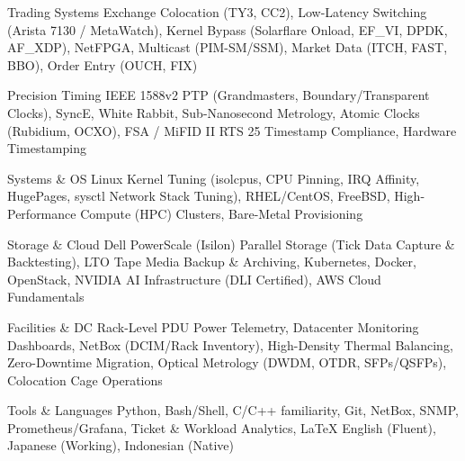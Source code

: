 

\begin{cvskills}

  \cvskill
    {Trading Systems} %
    {Exchange Colocation (TY3, CC2), Low-Latency Switching (Arista 7130 / MetaWatch), Kernel Bypass (Solarflare Onload, EF\_VI, DPDK, AF\_XDP), NetFPGA, Multicast (PIM-SM/SSM), Market Data (ITCH, FAST, BBO), Order Entry (OUCH, FIX)} %

  \cvskill
    {Precision Timing} %
    {IEEE 1588v2 PTP (Grandmasters, Boundary/Transparent Clocks), SyncE, White Rabbit, Sub-Nanosecond Metrology, Atomic Clocks (Rubidium, OCXO), FSA / MiFID II RTS 25 Timestamp Compliance, Hardware Timestamping} %

  \cvskill
    {Systems \& OS} %
    {Linux Kernel Tuning (isolcpus, CPU Pinning, IRQ Affinity, HugePages, sysctl Network Stack Tuning), RHEL/CentOS, FreeBSD, High-Performance Compute (HPC) Clusters, Bare-Metal Provisioning} %

  \cvskill
    {Storage \& Cloud} %
    {Dell PowerScale (Isilon) Parallel Storage (Tick Data Capture \& Backtesting), LTO Tape Media Backup \& Archiving, Kubernetes, Docker, OpenStack, NVIDIA AI Infrastructure (DLI Certified), AWS Cloud Fundamentals} %

  \cvskill
    {Facilities \& DC} %
    {Rack-Level PDU Power Telemetry, Datacenter Monitoring Dashboards, NetBox (DCIM/Rack Inventory), High-Density Thermal Balancing, Zero-Downtime Migration, Optical Metrology (DWDM, OTDR, SFPs/QSFPs), Colocation Cage Operations} %

  \cvskill
    {Tools \& Languages} %
    {Python, Bash/Shell, C/C++ familiarity, Git, NetBox, SNMP, Prometheus/Grafana, Ticket \& Workload Analytics, LaTeX {\enskip\cdotp\enskip} English (Fluent), Japanese (Working), Indonesian (Native)} %

\end{cvskills}
